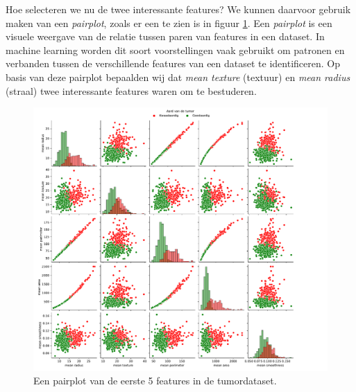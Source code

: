 \documentclass[TeamE-eindrapport]{subfiles}
\begin{document}
	Hoe selecteren we nu de twee interessante features? We kunnen daarvoor gebruik maken van een \textit{pairplot}, zoals er een te zien is in figuur \ref{fig:pairplot}. Een \textit{pairplot} is een visuele weergave van de relatie tussen paren van features in een dataset. In machine learning worden dit soort voorstellingen vaak gebruikt om patronen en verbanden tussen de verschillende features van een dataset te identificeren. Op basis van deze pairplot bepaalden wij dat \textit{mean texture} (textuur) en \textit{mean radius} (straal) twee interessante features waren om te bestuderen.
	
	\begin{figure}
		\centering
		\includegraphics[width=1\textwidth]{pairplot}
		\caption{Een pairplot van de eerste 5 features in de tumordataset.}
		\label{fig:pairplot}
	\end{figure}
\end{document}
